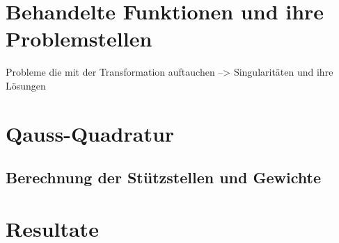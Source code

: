 \documentclass[12pt]{article}
\begin{document}
\newpage

\section{Behandelte Funktionen und ihre Problemstellen}


Probleme die mit der Transformation auftauchen --> Singularitäten und ihre Lösungen

\newpage

\section{Qauss-Quadratur}
\subsection{Berechnung der Stützstellen und Gewichte}

\newpage

\section{Resultate}

\newpage
\end{document}
